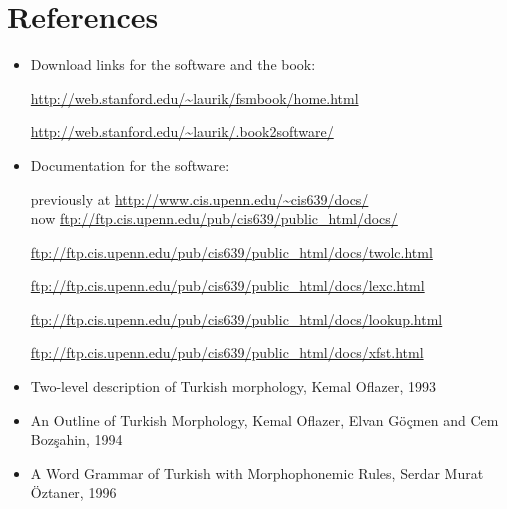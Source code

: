 \documentclass[11pt,a4paper]{article}
\begin{document}
\section{References}
\begin{itemize}
\item Download links for the software and the book: 

\url{http://web.stanford.edu/~laurik/fsmbook/home.html}

\url{http://web.stanford.edu/~laurik/.book2software/}

\item Documentation for the software: 

previously at \url{http://www.cis.upenn.edu/~cis639/docs/}\\ now \url{ftp://ftp.cis.upenn.edu/pub/cis639/public_html/docs/}

\url{ftp://ftp.cis.upenn.edu/pub/cis639/public_html/docs/twolc.html}

\url{ftp://ftp.cis.upenn.edu/pub/cis639/public_html/docs/lexc.html}

\url{ftp://ftp.cis.upenn.edu/pub/cis639/public_html/docs/lookup.html}

\url{ftp://ftp.cis.upenn.edu/pub/cis639/public_html/docs/xfst.html}

\item Two-level description of Turkish morphology, Kemal Oflazer, 1993 

\item An Outline of Turkish Morphology, Kemal Oflazer, Elvan Göçmen and Cem Bozşahin, 1994

\item A Word Grammar of Turkish with Morphophonemic Rules, Serdar Murat Öztaner, 1996


\end{itemize}
\end{document}

